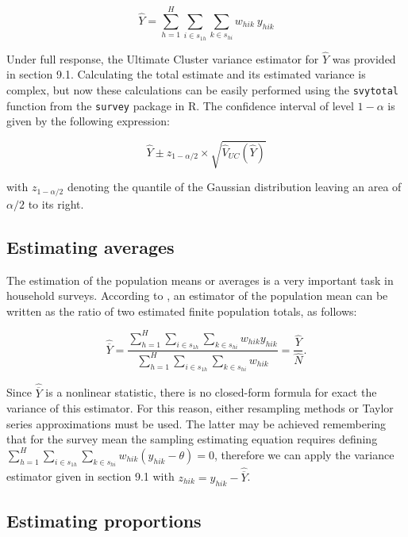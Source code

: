 \documentclass[
  12pt,
]{book}
\begin{document}
\[
\widehat{Y} = \sum_{h=1}^{H}\sum_{i \in s_{1h}} \sum_{ k \in s_{hi}} w_{hik} \ y_{hik}
\]

Under full response, the Ultimate Cluster variance estimator for \(\widehat{Y}\) was provided in section 9.1. Calculating the total estimate and its estimated variance is complex, but now these calculations can be easily performed using the \texttt{svytotal} function from the \texttt{survey} package in R. The confidence interval of level \(1 - \alpha\) is given by the following expression:

\[
\widehat{Y} \pm z_{1 - \alpha/2} \times \sqrt{\widehat{V}_{UC} \left( \widehat{Y}\right)}
\]

with \(z_{1 - \alpha/2}\) denoting the quantile of the Gaussian distribution leaving an area of \({\alpha/2}\) to its right.

\hypertarget{estimating-averages}{%
\subsection{Estimating averages}\label{estimating-averages}}

The estimation of the population means or averages is a very important task in household surveys. According to \citet{Gutierrez_2016}, an estimator of the population mean can be written as the ratio of two estimated finite population totals, as follows:

\[
\widehat{\overline{Y}} = \frac{\sum_{h=1}^{H}\sum_{i \in s_{1h}} \sum_{ k \in s_{hi}} w_{hik}y_{hik}} {\sum_{h=1}^{H}\sum_{i \in s_{1h}} \sum_{ k \in s_{hi}} w_{hik}} = \frac{\widehat{Y}}{\widehat{N}}.
\]

Since \(\widehat{\overline{Y}}\) is a nonlinear statistic, there is no closed-form formula for exact the variance of this estimator. For this reason, either resampling methods or Taylor series approximations must be used. The latter may be achieved remembering that for the survey mean the sampling estimating equation requires defining \(\sum_{h=1}^{H}\sum_{i \in s_{1h}} \sum_{ k \in s_{hi}} w_{hik} (y_{hik} - \theta) = 0\), therefore we can apply the variance estimator given in section 9.1 with \(z_{hik} = y_{hik} - \widehat{\overline{Y}}\).

\hypertarget{estimating-proportions}{%
\subsection{Estimating proportions}\label{estimating-proportions}}
\end{document}
